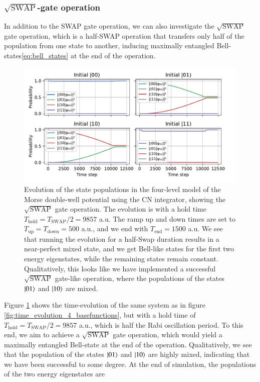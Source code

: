 \documentclass{subfiles}
\begin{document}
\subsubsection*{$\sqrt{\text{SWAP}}$-gate operation}
In addition to the SWAP gate operation, we can also investigate the $\sqrt{\text{SWAP}}$ gate operation, which is a half-SWAP operation that transfers only half of the population from one state to another, inducing maximally entangled Bell-states\eqref{eq:bell_states} at the end of the operation. 
\begin{figure}[h!]
    \centering
    \includegraphics[width=1.0\textwidth]{figs/time_evolution_4_basefunctions_2306_squareSWAP.pdf}
    \caption{Evolution of the state populations in the four-level model of the Morse double-well potential using the CN integrator, showing the $\sqrt{\text{SWAP}}$ gate operation. The evolution is with a hold time $T_{\text{hold}} = T_{\text{SWAP}}/2 = 9857$ a.u. The ramp up and down times are set to $T_{\text{up}} = T_{\text{down}} = 500$ a.u., and we end with $T_{\text{end}} = 1500$ a.u. We see that running the evolution for a half-Swap duration results in a near-perfect mixed state, and we get Bell-like states for the first two energy eigenstates, while the remaining states remain constant. Qualitatively, this looks like we have implemented a successful $\sqrt{\text{SWAP}}$ gate-like operation, where the populations of the states $\ket{01}$ and $\ket{10}$ are mixed.}
    \label{fig:time_evolution_4_basefunctions_sqrtSWAP}
\end{figure}
Figure \ref{fig:time_evolution_4_basefunctions_sqrtSWAP} shows the time-evolution of the same system as in figure \ref{fig:time_evolution_4_basefunctions}, but with a hold time of $T_{\text{hold}} = T_{\text{SWAP}}/2 = 9857$ a.u., which is half the Rabi oscillation period. To this end, we aim to achieve a $\sqrt{\text{SWAP}}$ gate operation, which would yield a maximally entangled Bell-state at the end of the operation. Qualitatively, we see that the population of the states $\ket{01}$ and $\ket{10}$ are highly mixed, indicating that we have been successful to some degree. At the end of simulation, the populations of the two energy eigenstates are
\end{document}
